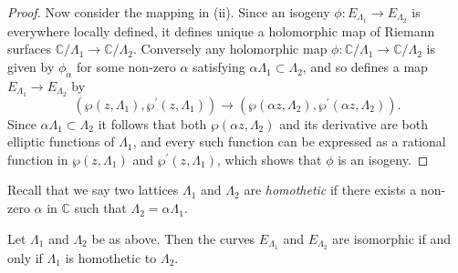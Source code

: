 \begin{proof}
   Now consider the mapping in (ii).  Since an isogeny $\phi : E_{\Lambda_{1}}
   \rightarrow E_{\Lambda_{2}}$ is everywhere locally defined, it defines unique a
   holomorphic map of Riemann surfaces $\mathbb{C} / \Lambda_{1} \rightarrow
   \mathbb{C} / \Lambda_{2}$.  Conversely any holomorphic map $\phi : \mathbb{C} /
   \Lambda_{1} \rightarrow \mathbb{C} / \Lambda_{2}$ is given by $\phi_{\alpha}$ for
   some non-zero $\alpha$ satisfying $\alpha \Lambda_{1} \subset \Lambda_{2}$, and so
   defines a map $E_{\Lambda_{1}} \rightarrow E_{\Lambda_{2}}$ by
   \begin{equation*}
     (\wp (z,\Lambda_{1}), \wp^{\prime}(z,\Lambda_{1})) \rightarrow (\wp (\alpha z,
     \Lambda_{2}), \wp^{\prime} (\alpha z , \Lambda_{2})).
   \end{equation*}
   Since $\alpha \Lambda_{1} \subset \Lambda_{2}$ it follows that both $\wp (\alpha
   z, \Lambda_{2})$ and its derivative are both elliptic functions of $\Lambda_{1}$,
   and every such function can be expressed as a rational function in $\wp (z,
   \Lambda_{1})$ and $\wp^{\prime} (z, \Lambda_{1})$, which shows that $\phi$ is an
   isogeny.
 \end{proof}

 Recall that we say two lattices $\Lambda_{1}$ and $\Lambda_{2}$ are
 \emph{homothetic} if there exists a non-zero $\alpha$ in $\mathbb{C}$ such that
 $\Lambda_{2} = \alpha \Lambda_{1}$.

 \begin{cor}
   \label{cor:homothetic-lattices-give-isomorphic-curves}
   Let $\Lambda_{1}$ and $\Lambda_{2}$ be as above.  Then the curves
   $E_{\Lambda_{1}}$ and $E_{\Lambda_{2}}$ are isomorphic if and only if
   $\Lambda_{1}$ is homothetic to $\Lambda_{2}$.
 \end{cor}

